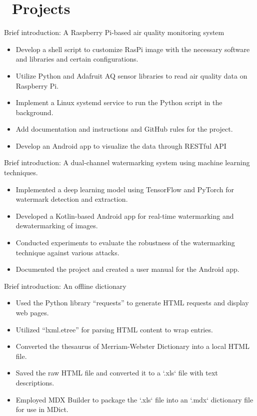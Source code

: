 \documentclass[12pt]{resume}
\begin{document}
\section{\texorpdfstring{\textbf{}\ Projects}{Projects}}

Brief introduction: A Raspberry Pi-based air quality monitoring system
\begin{itemize}
  \item Develop a shell script to customize RasPi image with the necessary software and libraries and certain configurations.
  \item Utilize Python and Adafruit AQ sensor libraries to read air quality data on Raspberry Pi.
  \item Implement a Linux systemd service to run the Python script in the background.
  \item Add documentation and instructions and GitHub rules for the project.
  \item Develop an Android app to visualize the data through RESTful API
\end{itemize}

Brief introduction: A dual-channel watermarking system using machine learning techniques.
\begin{itemize}
  \item Implemented a deep learning model using TensorFlow and PyTorch for watermark detection and extraction.
  \item Developed a Kotlin-based Android app for real-time watermarking and dewatermarking of images.
  \item Conducted experiments to evaluate the robustness of the watermarking technique against various attacks.
  \item Documented the project and created a user manual for the Android app.
\end{itemize}

Brief introduction: An offline dictionary
\begin{itemize}
  \item Used the Python library “requests” to generate HTML requests and display web pages.
  \item Utilized “lxml.etree” for parsing HTML content to wrap entries.
  \item Converted the thesaurus of Merriam-Webster Dictionary into a local HTML file.
  \item Saved the raw HTML file and converted it to a `.xls` file with text descriptions.
  \item Employed MDX Builder to package the `.xls` file into an `.mdx` dictionary file for use in MDict.
\end{itemize}
\end{document}
